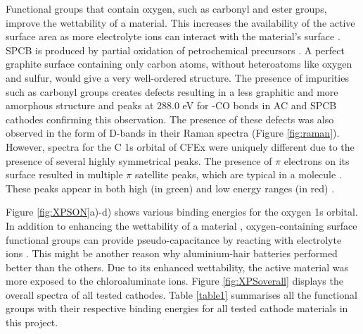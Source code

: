 \documentclass{article}
\begin{document}
Functional groups that contain oxygen, such as carbonyl and ester groups, improve the wettability of a material. This increases the availability of the active surface area as more electrolyte ions can interact with the material's surface \cite{younesi_analysis_2015}. SPCB is produced by partial oxidation of petrochemical precursors \cite{gnanamuthu_electrochemical_2011}. A perfect graphite surface containing only carbon atoms, without heteroatoms like oxygen and sulfur, would give a very well-ordered structure. The presence of impurities such as carbonyl groups creates defects resulting in a less graphitic and more amorphous structure \cite{hao_carbonaceous_2013} and peaks at 288.0 eV for -CO bonds in AC and SPCB cathodes confirming this observation. The presence of these defects was also observed in the form of D-bands in their Raman spectra (Figure \ref{fig:raman}). However, spectra for the C 1s orbital of CFEx were uniquely different due to the presence of several highly symmetrical peaks. The presence of $\pi$ electrons on its surface resulted in  multiple $\pi$ satellite peaks, which are typical in a  molecule \cite{skryleva_xps_2016}. These peaks appear in both high (in green) and low energy ranges (in red) \cite{erbahar_spectromicroscopy_2016, poirier_carbon_1993}. 

Figure \ref{fig:XPSON}a)-d) shows various binding energies for the oxygen 1s orbital. In addition to enhancing the wettability of a material \cite{li_effect_2011, oh_oxygen_2014}, oxygen-containing surface functional groups can provide pseudo-capacitance by reacting with electrolyte ions \cite{bleda-martinez_role_2005}. This might be another reason why aluminium-hair batteries performed better than the others. Due to its enhanced wettability, the active material was more exposed to the chloroaluminate ions. Figure \ref{fig:XPSoverall} displays the overall spectra of all tested cathodes. Table \ref{table1} summarises all the functional groups with their respective binding energies for all tested cathode materials in this project.
\end{document}
